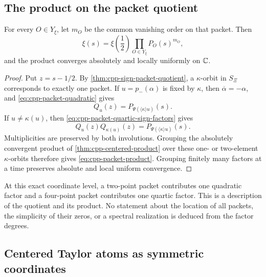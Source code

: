 \subsection{The product on the packet quotient}

\begin{theorem}
\label{thm:cpp-packet-product}
For every \(O\in Y_\xi\), let \(m_O\) be the common vanishing order on that
packet.  Then
\begin{equation}
\label{eq:cpp-packet-product}
 \xi(s)
 =
 \xi\!\left(\frac12\right)
 \prod_{O\in Y_\xi}P_O(s)^{m_O},
\end{equation}
and the product converges absolutely and locally uniformly on \(\mathbb C\).
\end{theorem}

\begin{proof}
Put \(z=s-1/2\).  By \cref{thm:cpp-sign-packet-quotient}, a
\(\kappa\)-orbit in \(S_\Xi\) corresponds to exactly one packet.
If \(u=p_-(\alpha)\) is fixed by \(\kappa\), then
\(\overline\alpha=-\alpha\), and
\eqref{eq:cpp-packet-quadratic} gives
\[
 Q_u(z)=P_{\Psi(\langle\kappa\rangle u)}(s).
\]
If \(u\ne\kappa(u)\), then
\eqref{eq:cpp-packet-quartic-sign-factors} gives
\[
 Q_u(z)Q_{\kappa(u)}(z)
 =
 P_{\Psi(\langle\kappa\rangle u)}(s).
\]
Multiplicities are preserved by both involutions.  Grouping the
absolutely convergent product of \cref{thm:cpp-centered-product} over these
one- or two-element \(\kappa\)-orbits therefore gives
\eqref{eq:cpp-packet-product}.  Grouping finitely many factors at a time
preserves absolute and local uniform convergence.
\end{proof}

\begin{remark}
\label{rem:cpp-packet-degree-scope}
At this exact coordinate level, a two-point packet contributes one quadratic
factor and a four-point packet contributes one quartic factor.  This is a
description of the quotient and its product.  No statement about the location
of all packets, the simplicity of their zeros, or a spectral realization is
deduced from the factor degrees.
\end{remark}

\subsection{Centered Taylor atoms as symmetric coordinates}

